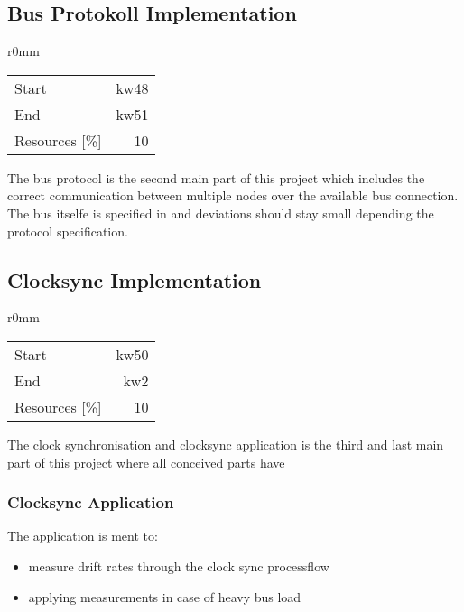 \subsection{Bus Protokoll Implementation}
\begin{wrapfigure}{r}{0mm}
\begin{tabular}[t]{|lr|}
\hline
Start & kw48\\
End & kw51\\
Resources [\%] & 10\\
\hline
\end{tabular}
\end{wrapfigure}
The bus protocol is the second main part of this project which includes the correct communication
between multiple nodes over the available bus connection. 
The bus itselfe is specified in \cite [NESD2]{NESD2} and deviations should stay small depending 
the protocol specification.
\subsection{Clocksync Implementation}
\begin{wrapfigure}{r}{0mm}
\begin{tabular}[t]{|lr|}
\hline
Start & kw50\\
End & kw2\\
Resources [\%] & 10\\
\hline
\end{tabular}
\end{wrapfigure}
The clock synchronisation and clocksync application is the third and last main part of 
this project where all conceived parts have
\subsubsection{Clocksync Application}
The application is ment to:
\begin{itemize}
 \item measure drift rates through the clock sync processflow
 \item applying measurements in case of heavy bus load
\end{itemize}
